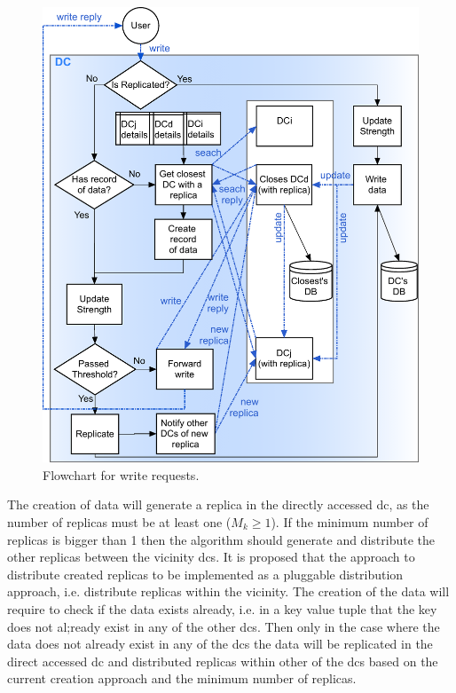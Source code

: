 \documentclass[english]{article}
\begin{document}
\begin{figure}[htpb!]
	\includegraphics[width=1\textwidth]{figures/writeRequestFlowchart.png}
	
	\caption{Flowchart for write requests.}
	\label{fig:write_flowchart}
\end{figure}

The creation of data will generate a replica in the directly accessed \gls{dc}, as the number of replicas must be at least one ($M_{k} \ge 1$). If the minimum number of replicas is bigger than 1 then the algorithm should generate and distribute the other replicas between the vicinity \glspl{dc}. It is proposed that the approach to distribute created replicas to be implemented as a pluggable distribution approach, i.e. distribute replicas within the vicinity. The creation of the data will require to check if the data exists already, i.e. in a key value tuple that the key does not al;ready exist in any of the other \glspl{dc}. Then only in the case where the data does not already exist in any of the \glspl{dc} the data will be replicated in the direct accessed \gls{dc} and distributed replicas within other of the \glspl{dc} based on the current creation approach and the minimum number of replicas.
\end{document}
